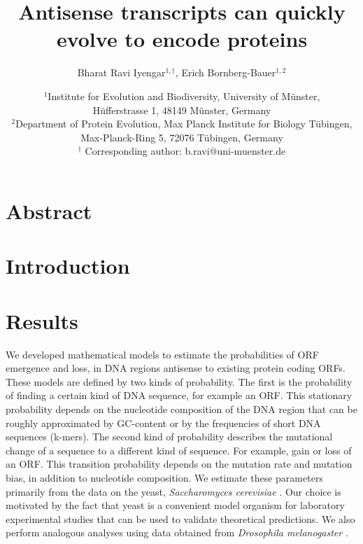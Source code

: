 \documentclass[12pt,a4paper]{article}
\title{Antisense transcripts can quickly evolve to encode proteins}
\author{Bharat Ravi Iyengar$^{1,\dagger}$, Erich Bornberg-Bauer$^{1,2}$}
\date{\small $^1$Institute for Evolution and Biodiversity, University of M\"{u}nster,\\ H\"{u}fferstrasse 1, 48149 M\"{u}nster, Germany\\[1ex] $^2$Department of Protein Evolution, Max Planck Institute for Biology T\"{u}bingen, Max-Planck-Ring 5, 72076 T\"{u}bingen, Germany \\[1ex] $^\dagger$ Corresponding author: b.ravi@uni-muenster.de}
\begin{document}
\onehalfspacing
\def\figdir{../Figures/M2_main/pdf}

\setlength{\abovedisplayskip}{0pt}
\setlength{\belowdisplayskip}{1em}

\maketitle


\linenumbers

\section*{Abstract}




\section*{Introduction}



\section*{Results}

We developed mathematical models to estimate the probabilities of ORF emergence and loss, in DNA regions antisense to existing protein coding ORFs. These models are defined by two kinds of probability. The first is the probability of finding a certain kind of DNA sequence, for example an ORF. This stationary probability depends on the nucleotide composition of the DNA region that can be roughly approximated by GC-content or by the frequencies of short DNA sequences (k-mers). The second kind of probability describes the mutational change of a sequence to a different kind of sequence. For example, gain or loss of an ORF. This transition probability depends on the mutation rate and mutation bias, in addition to nucleotide composition. We estimate these parameters primarily from the data on the yeast, \textit{Saccharomyces cerevisiae} \citep{scermutrate}. Our choice is motivated by the fact that yeast is a convenient model organism for laboratory experimental studies that can be used to validate theoretical predictions. We also perform analogous analyses using data obtained from \textit{Drosophila melanogaster} \citep[][Supplementary section XX]{drosophilamutrate}.
\end{document}
